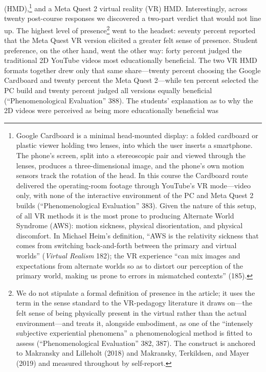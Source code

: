 (HMD),\footnote{Google Cardboard is a minimal head-mounted display: a folded cardboard or
plastic viewer holding two lenses, into which the user inserts a smartphone. The
phone's screen, split into a stereoscopic pair and viewed through the lenses,
produces a three-dimensional image, and the phone's own motion sensors track the
rotation of the head. In this course the Cardboard route delivered the
operating-room footage through YouTube's VR mode---video only, with none of the
interactive environment of the PC and Meta Quest 2 builds (``Phenomenological
Evaluation'' 383). Given the nature of this setup, of all VR methods it is the
most prone to producing Alternate World Syndrome (AWS): motion sickness,
physical disorientation, and physical discomfort. In Michael Heim's definition,
``AWS is the relativity sickness that comes from switching back-and-forth
between the primary and virtual worlds'' (\textit{Virtual Realism} 182); the VR
experience ``can mix images and expectations from alternate worlds so as to
distort our perception of the primary world, making us prone to errors in
mismatched contexts'' (185).} and a Meta Quest 2 virtual reality (VR) HMD.
Interestingly, across twenty post-course responses we discovered a two-part
verdict that would not line up. The highest level of presence\footnote{We do not
stipulate a formal definition of presence in the article; it uses the term in
the sense standard to the VR-pedagogy literature it draws on---the felt sense of
being physically present in the virtual rather than the actual environment---and
treats it, alongside embodiment, as one of the ``intensely subjective
experiential phenomena'' a phenomenological method is fitted to assess
(``Phenomenological Evaluation'' 382, 387). The construct is anchored to
Makransky and Lilleholt (2018) and Makransky, Terkildsen, and Mayer (2019) and
measured throughout by self-report.} went to the headset: seventy percent
reported that the Meta Quest VR version elicited a greater felt sense of
presence. Student preference, on the other hand, went the other way: forty
percent judged the traditional 2D YouTube videos most educationally beneficial.
The two VR HMD formats together drew only that same share---twenty percent
choosing the Google Cardboard and twenty percent the Meta Quest 2---while ten
percent selected the PC build and twenty percent judged all versions equally
beneficial (``Phenomenological Evaluation'' 388). The students' explanation as
to why the 2D videos were perceived as being more educationally beneficial was
